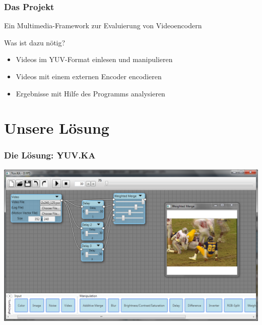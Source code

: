 \documentclass[t]{beamer}
\begin{document}
\begin{frame}
	\frametitle{Das Projekt}
	\begin{center}
		Ein Multimedia-Framework zur Evaluierung von Videoencodern	
	\end{center}
	 Was ist dazu nötig? \newline
	\begin{itemize}
		\item<1-> Videos im YUV-Format einlesen und manipulieren
		\item<1-> Videos mit einem externen Encoder encodieren
		\item<1-> Ergebnisse mit Hilfe des Programms analysieren
	\end{itemize}
\end{frame}

\section{Unsere Lösung}
\begin{frame}
	\frametitle{Die Lösung: YUV.KA}
	\begin{center}
		\includegraphics[height=.9\textheight]{startup_screenshot.png}
	\end{center}
\end{frame}
\end{document}
